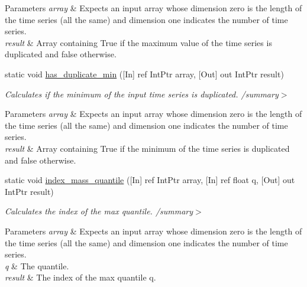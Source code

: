 \begin{DoxyCompactItemize}
\begin{DoxyCompactList}
\begin{DoxyParams}{Parameters}
{\em array} & Expects an input array whose dimension zero is the length of the time series (all the same) and dimension one indicates the number of time series.\\
\hline
{\em result} & Array containing True if the maximum value of the time series is duplicated and false otherwise.\\
\hline
\end{DoxyParams}
\end{DoxyCompactList}\item 
static void \mbox{\hyperlink{classkhiva_1_1interop_1_1_d_l_l_features_af45a7b69d5140c2d7645facc413cf24c}{has\+\_\+duplicate\+\_\+min}} (\mbox{[}In\mbox{]} ref Int\+Ptr array, \mbox{[}Out\mbox{]} out Int\+Ptr result)
\begin{DoxyCompactList}\small\item\em Calculates if the minimum of the input time series is duplicated. /summary$>$ 
\begin{DoxyParams}{Parameters}
{\em array} & Expects an input array whose dimension zero is the length of the time series (all the same) and dimension one indicates the number of time series.\\
\hline
{\em result} & Array containing True if the minimum of the time series is duplicated and false otherwise.\\
\hline
\end{DoxyParams}
\end{DoxyCompactList}\item 
static void \mbox{\hyperlink{classkhiva_1_1interop_1_1_d_l_l_features_a9eed336a9d138b9a4f37bcbbcf40287e}{index\+\_\+mass\+\_\+quantile}} (\mbox{[}In\mbox{]} ref Int\+Ptr array, \mbox{[}In\mbox{]} ref float q, \mbox{[}Out\mbox{]} out Int\+Ptr result)
\begin{DoxyCompactList}\small\item\em Calculates the index of the max quantile. /summary$>$ 
\begin{DoxyParams}{Parameters}
{\em array} & Expects an input array whose dimension zero is the length of the time series (all the same) and dimension one indicates the number of time series.\\
\hline
{\em q} & The quantile.\\
\hline
{\em result} & The index of the max quantile q.\\
\hline
\end{DoxyParams}
\end{DoxyCompactList}\item 

\end{DoxyCompactItemize}
